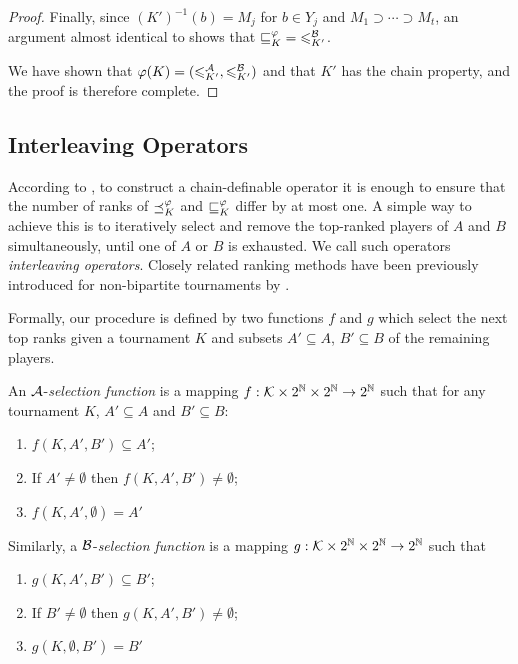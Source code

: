 \begin{proof}
    Finally, since $(K')^{-1}(b) = M_j$ for $b \in Y_j$ and $M_1 \supset \cdots
    \supset M_t$, an argument almost identical to
     shows that ${\sqsubseteq_K^\varphi} =
    {\leqslant^{\mathcal{B}}_{K'}}$.

    We have shown that $\varphi(K) = ({\leqslant^{\mathcal{A}}_{K'}}, {\leqslant^{\mathcal{B}}_{K'}})$ and that $K'$
    has the chain property, and the proof is therefore complete.
\end{proof}

\subsection{Interleaving Operators}
\label{tourn_sec_interleaving}

According to , to construct a
chain-definable operator it is enough to ensure that the number of ranks of
$\preceq_K^\varphi$ and $\sqsubseteq_K^\varphi$ differ by at most one. A simple way to achieve
this is to iteratively select and remove the top-ranked players of $A$ and $B$
simultaneously, until one of $A$ or $B$ is exhausted. We call such operators
\emph{interleaving operators}. Closely related ranking methods have been
previously introduced for non-bipartite tournaments by
\textcite{bouyssou2004monotonicity}.

Formally, our procedure is defined by two functions $f$ and $g$ which select
the next top ranks given a tournament $K$ and subsets $A' \subseteq A$, $B'
\subseteq B$ of the remaining players.

\begin{definition}%
    \label{tourn_def_selectionfunction}

     An $\mathcal{A}$-\emph{selection function} is a mapping $f: \mathcal{K} \times 2^{\mathbb{N}} \times
     2^{\mathbb{N}} \to 2^{\mathbb{N}}$ such that for any tournament $K$, $A' \subseteq A$ and $B'
     \subseteq B$:
    \begin{enumerate}
        \item \label{tourn_item_f_sel_1} $f(K, A', B') \subseteq A'$;
        \item \label{tourn_item_f_sel_2} If $A' \ne \emptyset$ then $f(K, A', B') \ne
              \emptyset$;
        \item \label{tourn_item_f_sel_3} $f(K, A', \emptyset) = A'$
    \end{enumerate}

    Similarly, a $\mathcal{B}$-\emph{selection function} is a mapping $g: \mathcal{K} \times 2^{\mathbb{N}}
    \times 2^{\mathbb{N}} \to 2^{\mathbb{N}}$ such that
    \begin{enumerate}
        \item \label{tourn_item_g_sel_1} $g(K, A', B') \subseteq B'$;
        \item \label{tourn_item_g_sel_2} If $B' \ne \emptyset$ then $g(K, A', B') \ne
              \emptyset$;
        \item \label{tourn_item_g_sel_3} $g(K, \emptyset, B') = B'$
    \end{enumerate}

\end{definition}

